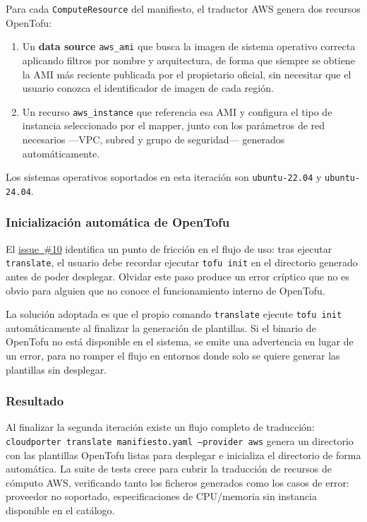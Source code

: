 Para cada \texttt{ComputeResource} del manifiesto, el traductor AWS genera dos recursos
OpenTofu:

\begin{enumerate}
    \item Un \textbf{data source} \texttt{aws\_ami} que busca la imagen de sistema operativo
    correcta aplicando filtros por nombre y arquitectura, de forma que siempre se obtiene la
    AMI más reciente publicada por el propietario oficial, sin necesitar que el usuario
    conozca el identificador de imagen de cada región.
    \item Un recurso \texttt{aws\_instance} que referencia esa AMI y configura el tipo de
    instancia seleccionado por el mapper, junto con los parámetros de red necesarios
    —VPC, subred y grupo de seguridad— generados automáticamente.
\end{enumerate}

Los sistemas operativos soportados en esta iteración son \texttt{ubuntu-22.04} y
\texttt{ubuntu-24.04}.

\subsubsection{Inicialización automática de OpenTofu}

El \href{https://github.com/lucpez/cloudporter/issues/10}{issue~\#10} identifica un punto de fricción en el flujo de uso: tras ejecutar
\texttt{translate}, el usuario debe recordar ejecutar \texttt{tofu init} en el directorio
generado antes de poder desplegar. Olvidar este paso produce un error críptico que no es
obvio para alguien que no conoce el funcionamiento interno de OpenTofu.

La solución adoptada es que el propio comando \texttt{translate} ejecute \texttt{tofu init}
automáticamente al finalizar la generación de plantillas. Si el binario de OpenTofu no está
disponible en el sistema, se emite una advertencia en lugar de un error, para no romper el
flujo en entornos donde solo se quiere generar las plantillas sin desplegar.

\subsubsection{Resultado}

Al finalizar la segunda iteración existe un flujo completo de traducción:
\texttt{cloudporter translate manifiesto.yaml --provider aws} genera un directorio con las
plantillas OpenTofu listas para desplegar e inicializa el directorio de forma automática.
La suite de tests crece para cubrir la traducción de recursos de cómputo AWS, verificando
tanto los ficheros generados como los casos de error: proveedor no soportado, especificaciones
de CPU/memoria sin instancia disponible en el catálogo.

